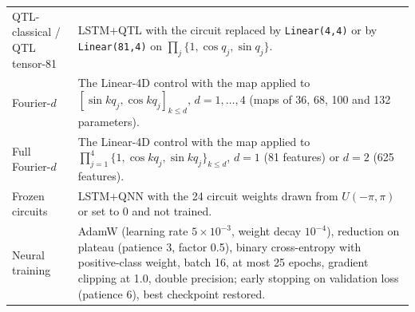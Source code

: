 \documentclass[11pt,a4paper]{article}
\begin{document}
\begin{table}[htbp]
\begin{tabular}{@{}p{}p{}@{}}
QTL-classical / QTL tensor-81 & LSTM+QTL with the circuit replaced by \texttt{Linear(4,4)} or by \texttt{Linear(81,4)} on $\prod_{j}\{1,\cos q_j,\sin q_j\}$. \\
Fourier-$d$ & The Linear-4D control with the map applied to $[\sin kq_j,\cos kq_j]_{k\le d}$, $d=1,\dots,4$ (maps of 36, 68, 100 and 132 parameters). \\
Full Fourier-$d$ & The Linear-4D control with the map applied to $\prod_{j=1}^{4}\{1,\cos kq_j,\sin kq_j\}_{k\le d}$, $d=1$ (81 features) or $d=2$ (625 features). \\
Frozen circuits & LSTM+QNN with the 24 circuit weights drawn from $U(-\pi,\pi)$ or set to 0 and not trained. \\
Neural training & AdamW (learning rate $5\times10^{-3}$, weight decay $10^{-4}$), reduction on plateau (patience 3, factor 0.5), binary cross-entropy with positive-class weight, batch 16, at most 25 epochs, gradient clipping at 1.0, double precision; early stopping on validation loss (patience 6), best checkpoint restored. \\
\bottomrule
\end{tabular}
\end{table}
\end{document}
